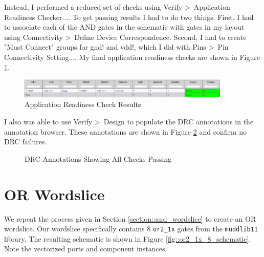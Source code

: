 \documentclass{article}
\begin{document}
	\noindent Instead, I performed a reduced set of checks using Verify \textgreater\ Application Readiness Checker.... To get passing results I had to do two things. First, I had to associate each of the AND gates in the schematic with gates in my layout using Connectivity \textgreater\ Define Device Correspondence. Second, I had to create "Must Connect" groups for gnd! and vdd!, which I did with Pins \textgreater\ Pin Connectivity Setting.... My final application readiness checks are shown in Figure \ref{fig::and_application_readiness_check}.
	
	\begin{figure}[H]
		\centerline{\includegraphics[width=0.9\textwidth]{and_application_readiness_check.png}}
		\caption{Application Readiness Check Results}
		\label{fig::and_application_readiness_check}
	\end{figure}
	
	\noindent I also was able to use Verify \textgreater\ Design to populate the DRC annotations in the annotation browser. These annotations are shown in Figure \ref{fig::and_drc} and confirm no DRC failures.
	
	\begin{figure}[H]
		\centerline{}
		\caption{DRC Annotations Showing All Checks Passing}
		\label{fig::and_drc}
	\end{figure}
	
	\section{OR Wordslice}
	
	We repeat the process given in Section \ref{section::and_wordslice} to create an OR wordslice.  Our wordslice specifically contains 8 \texttt{or2\_1x} gates from the \texttt{muddlib11} library. The resulting schematic is shown in Figure \ref{fig::or2_1x_8_schematic}. Note the vectorized ports and component instances.
	
\end{document}
